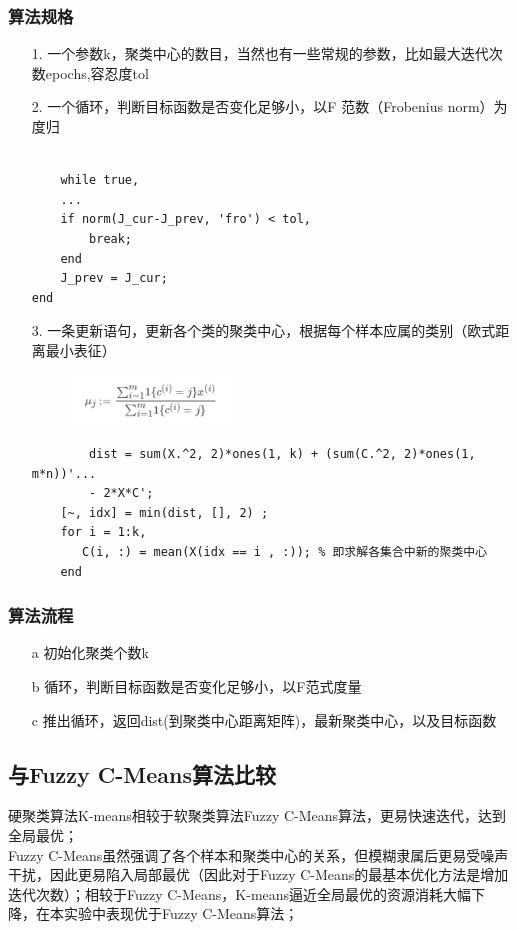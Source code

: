 \documentclass{article}
\begin{document}
\subsubsection{算法规格}
\begin{itemize}
\item[1.]一个参数k，聚类中心的数目，当然也有一些常规的参数，比如最大迭代次数epochs,容忍度tol
\item[2.]一个循环，判断目标函数是否变化足够小，以F
范数（Frobenius norm）为度归


    
    \begin{lstlisting}
    
    while true,
    ...
    if norm(J_cur-J_prev, 'fro') < tol,
        break;
    end
    J_prev = J_cur;
end
    \end{lstlisting}
    
      \item[3.]一条更新语句，更新各个类的聚类中心，根据每个样本应属的类别（欧式距离最小表征）
    \begin{figure}[H]
        \centering
        \includegraphics[width=0.4\textwidth]{img/al2.jpg} 

    \end{figure}
  
    \begin{lstlisting}
        dist = sum(X.^2, 2)*ones(1, k) + (sum(C.^2, 2)*ones(1, m*n))'...
        - 2*X*C';
    [~, idx] = min(dist, [], 2) ;
    for i = 1:k,
       C(i, :) = mean(X(idx == i , :)); % 即求解各集合中新的聚类中心
    end
    \end{lstlisting}
    \end{itemize}
\subsubsection{算法流程}
\begin{itemize}
\item[a] 初始化聚类个数k
\item[b] 循环，判断目标函数是否变化足够小，以F范式度量
\item[c] 推出循环，返回dist(到聚类中心距离矩阵)，最新聚类中心，以及目标函数
\end{itemize}

\subsection{与Fuzzy C-Means算法比较}
硬聚类算法K-means相较于软聚类算法Fuzzy C-Means算法，更易快速迭代，达到全局最优；\\
Fuzzy C-Means虽然强调了各个样本和聚类中心的关系，但模糊隶属后更易受噪声干扰，因此更易陷入局部最优（因此对于Fuzzy C-Means的最基本优化方法是增加迭代次数）；相较于Fuzzy C-Means，K-means逼近全局最优的资源消耗大幅下降，在本实验中表现优于Fuzzy C-Means算法；
\end{document}
